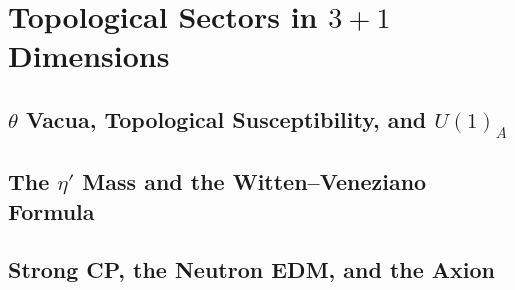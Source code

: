 \section{Topological Sectors in $3+1$ Dimensions}
\label{sec:sectors-3plus1d}


\subsection{$\theta$ Vacua, Topological Susceptibility, and $U(1)_A$}
\label{subsec:theta-chi-u1a}


\subsection{The $\eta'$ Mass and the Witten--Veneziano Formula}
\label{subsec:eta-prime-wv}


\subsection{Strong CP, the Neutron EDM, and the Axion}
\label{subsec:strong-cp-axion}


